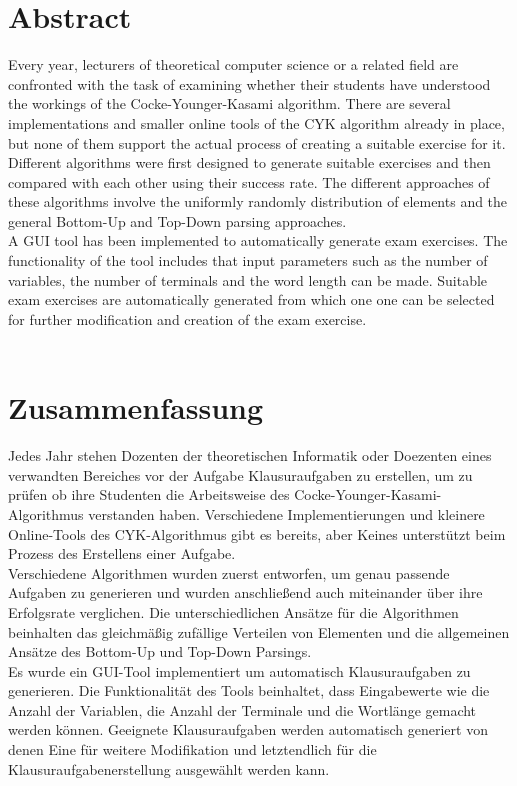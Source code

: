 \section*{Abstract}\label{abtract}
Every year, lecturers of theoretical computer science or a related field are confronted with the task of examining whether their students have understood the workings of the Cocke-Younger-Kasami algorithm. There are several implementations and smaller online tools of the CYK algorithm already in place, but none of them support the actual process of creating a suitable exercise for it.\\
Different algorithms were first designed to generate suitable exercises and then compared with each other using their success rate. The different approaches of these algorithms involve the uniformly randomly distribution of elements and the general Bottom-Up and Top-Down parsing approaches.\\
A GUI tool has been implemented to automatically generate exam exercises. The functionality of the tool includes that input parameters such as the number of variables, the number of terminals and the word length can be made. Suitable exam exercises are automatically generated from which one one can be selected for further modification and creation of the exam exercise.\\

~~

\section*{Zusammenfassung}\label{zusammenfassung}
Jedes Jahr stehen Dozenten der theoretischen Informatik oder Doezenten eines verwandten Bereiches vor der Aufgabe Klausuraufgaben zu erstellen, um zu prüfen ob ihre Studenten die Arbeitsweise des Cocke-Younger-Kasami-Algorithmus verstanden haben. Verschiedene Implementierungen und kleinere Online-Tools des CYK-Algorithmus gibt es bereits, aber Keines unterstützt beim Prozess des Erstellens einer Aufgabe.\\
Verschiedene Algorithmen wurden zuerst entworfen, um genau passende Aufgaben zu generieren und wurden anschließend auch miteinander über ihre Erfolgsrate verglichen. Die unterschiedlichen Ansätze für die Algorithmen beinhalten das gleichmäßig zufällige Verteilen von Elementen und die allgemeinen Ansätze des Bottom-Up und Top-Down Parsings.\\
Es wurde ein GUI-Tool implementiert um automatisch Klausuraufgaben zu generieren. Die Funktionalität des Tools beinhaltet, dass Eingabewerte wie die Anzahl der Variablen, die Anzahl der Terminale und die Wortlänge gemacht werden können. Geeignete Klausuraufgaben werden automatisch generiert von denen Eine für weitere Modifikation und letztendlich für die Klausuraufgabenerstellung ausgewählt werden kann.\\



\pagebreak

